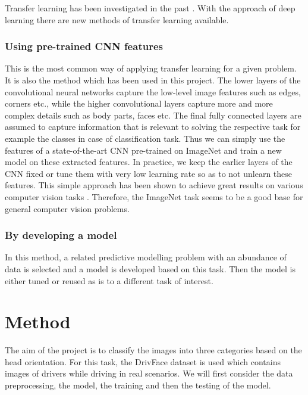 \documentclass[a4paper, 12pt, oneside, BCOR1cm,toc=chapterentrywithdots]{scrbook}
\begin{document}
Transfer learning has been investigated in the past \cite{}. With the approach of deep learning there are new methods of transfer learning available.

\subsection{Using pre-trained CNN features}


This is the most common way of applying transfer learning for a given problem. It is also the method which has been used in this project. The lower layers of the convolutional neural networks capture the low-level image features such as edges, corners etc., while the higher convolutional layers capture more and more complex details such as body parts, faces etc. The final fully connected layers are assumed to capture information that is relevant to solving the respective task for example the classes in case of classification task.
Thus we can simply use the features of a state-of-the-art CNN pre-trained on ImageNet \cite{} and train a new model on these extracted features. In practice, we keep the earlier layers of the CNN fixed or tune them with very low learning rate so as to not unlearn these features. This simple approach has been shown to achieve great results on various computer vision tasks \cite{}. Therefore, the ImageNet task seems to be a good base for general computer vision problems. 

\subsection{By developing a model}

In this method, a related predictive modelling problem with an abundance of data is selected and a model is developed based on this task. Then the model is either tuned or reused as is to a different task of interest. 

\chapter{Method}

The aim of the project is to classify the images into three categories based on the head orientation. For this task, the DrivFace dataset \cite{} is used which contains images of drivers while driving in real scenarios. We will first consider the data preprocessing, the model, the training and then the testing of the model.
\end{document}

